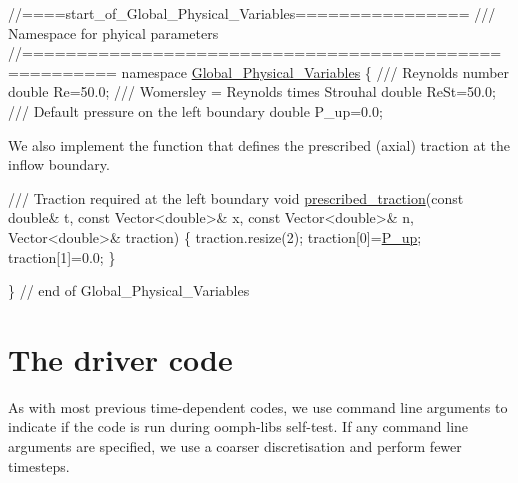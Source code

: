  
\begin{DoxyCodeInclude}
\textcolor{comment}{//====start\_of\_Global\_Physical\_Variables================}
\textcolor{comment}{/// Namespace for phyical parameters}
\textcolor{comment}{}\textcolor{comment}{//======================================================}
\textcolor{keyword}{namespace }\hyperlink{namespaceGlobal__Physical__Variables}{Global\_Physical\_Variables}
\{\textcolor{comment}{}
\textcolor{comment}{ /// Reynolds number}
\textcolor{comment}{} \textcolor{keywordtype}{double} Re=50.0;
\textcolor{comment}{}
\textcolor{comment}{ /// Womersley = Reynolds times Strouhal}
\textcolor{comment}{} \textcolor{keywordtype}{double} ReSt=50.0;
 \textcolor{comment}{}
\textcolor{comment}{ /// Default pressure on the left boundary}
\textcolor{comment}{} \textcolor{keywordtype}{double} P\_up=0.0;

\end{DoxyCodeInclude}


We also implement the function that defines the prescribed (axial) traction at the inflow boundary.


\begin{DoxyCodeInclude}
\textcolor{comment}{}
\textcolor{comment}{ /// Traction required at the left boundary}
\textcolor{comment}{} \textcolor{keywordtype}{void} \hyperlink{namespaceGlobal__Physical__Variables_a0de42ee6d39e85c77c16a04c3a05f7a2}{prescribed\_traction}(\textcolor{keyword}{const} \textcolor{keywordtype}{double}& t,
                          \textcolor{keyword}{const} Vector<double>& x,
                          \textcolor{keyword}{const} Vector<double>& n,
                          Vector<double>& traction)
 \{
  traction.resize(2);
  traction[0]=\hyperlink{namespaceGlobal__Physical__Variables_ae1a493695b7f4619af32f405b0b28861}{P\_up};
  traction[1]=0.0;
 \} 

\} \textcolor{comment}{// end of Global\_Physical\_Variables}

\end{DoxyCodeInclude}




 

\hypertarget{index_main}{}\section{The driver code}\label{index_main}
 As with most previous time-\/dependent codes, we use command line arguments to indicate if the code is run during {\ttfamily oomph-\/lib\textquotesingle{}s} self-\/test. If any command line arguments are specified, we use a coarser discretisation and perform fewer timesteps.


